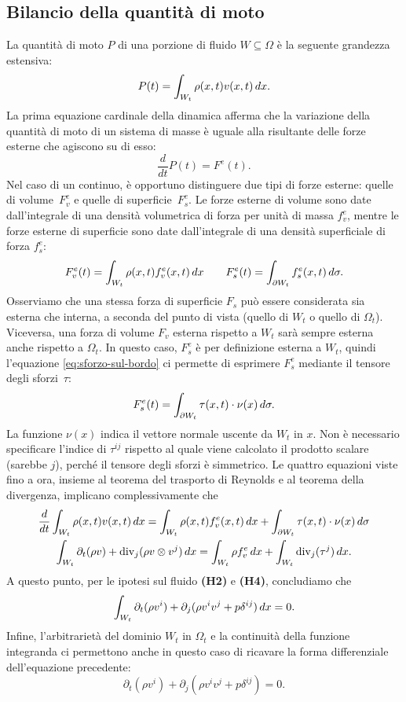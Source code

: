 \subsection*{Bilancio della quantità di moto}

La quantità di moto $P$ di una porzione di fluido $W \subseteq \Omega$ è la
seguente grandezza estensiva:
\[
P(t) = \int_{W_t} \rho(x,t) v(x,t) \, dx.
\]
La prima equazione cardinale della dinamica afferma che la variazione
della quantità di moto di un sistema di masse è uguale alla
risultante delle forze esterne che agiscono su di esso:
\[
\frac{d}{dt} P(t) = F^e(t).
\]
Nel caso di un continuo, è opportuno distinguere due tipi di forze
esterne: quelle di volume~$F_v^e$ e quelle di superficie~$F_s^e$.
Le forze esterne di volume sono date dall'integrale di 
una densità volumetrica di forza per unità di massa $f_v^e$,
mentre le forze esterne di superficie sono date dall'integrale
di una densità superficiale di forza $f_s^e$:
\[
F_v^e(t) = \int_{W_t} \rho(x,t) f_v^e(x,t) \, dx
\qquad F_s^e(t) = \int_{\partial W_t} f_s^e(x,t) \, d\sigma.
\]
Osserviamo che una stessa forza di superficie $F_s$ può essere
considerata sia esterna che interna, a seconda del punto di vista
(quello di $W_t$ o quello di $\Omega_t$).
Viceversa, una forza di volume $F_v$ esterna rispetto a $W_t$
sarà sempre esterna anche rispetto a $\Omega_t$.
In questo caso, $F_s^e$ è per definizione esterna a $W_t$,
quindi l'equazione \eqref{eq:sforzo-sul-bordo} ci permette di
esprimere $F_s^e$ mediante il tensore degli sforzi~$\tau$:
\[
F_s^e(t) = \int_{\partial W_t} \tau(x,t) \cdot \nu(x) \, d\sigma.
\]
La funzione $\nu(x)$ indica il vettore normale uscente da $W_t$ in $x$.
Non è necessario specificare l'indice di $\tau^{ij}$ rispetto al quale
viene calcolato il prodotto scalare (sarebbe $j$), perché il tensore
degli sforzi è simmetrico. Le quattro equazioni viste fino a ora,
insieme al teorema del trasporto di Reynolds e al teorema della divergenza,
implicano complessivamente che
\begin{gather*}
\frac{d}{dt} \int_{W_t} \rho(x,t) v(x,t) \, dx
	= \int_{W_t} \rho(x,t) f_v^e(x,t) \, dx
	+ \int_{\partial W_t} \tau(x,t) \cdot \nu(x) \, d\sigma \\
\int_{W_t} \partial_t (\rho v) + \operatorname{div}_j(\rho v \otimes v^j) \, dx
	= \int_{W_t} \rho f_v^e \, dx
	+ \int_{W_t} \operatorname{div}_j(\tau^j) \, dx.
\end{gather*}
A questo punto, per le ipotesi sul fluido \textbf{(H2)} e \textbf{(H4)},
concludiamo che
\[
\int_{W_t} \partial_t (\rho v^i)
	+ \partial_j (\rho v^i v^j + p\delta^{ij}) \, dx
= 0.
\]
Infine, l'arbitrarietà del dominio $W_t$ in $\Omega_t$ e la continuità
della funzione integranda ci permettono anche in questo caso di ricavare 
la forma differenziale dell'equazione precedente:
\begin{equation} \label{eq:bilancio-quantita-di-moto}
\partial_t (\rho v^i) + \partial_j (\rho v^i v^j + p\delta^{ij}) = 0.
\end{equation}

